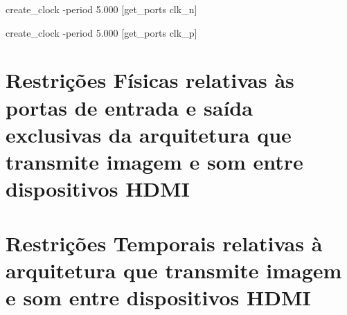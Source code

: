 \small{
	
	create\_clock -period 5.000 [get\_ports clk\_n]
	
	create\_clock -period 5.000 [get\_ports clk\_p]}

\section{Restrições Físicas relativas às portas de entrada e saída exclusivas da arquitetura que transmite imagem e som entre dispositivos HDMI}\label{ap:fisicas_planC_especificas}

\section{Restrições Temporais relativas à arquitetura que transmite imagem e som entre dispositivos HDMI} \label{ap:temporais_planC}
	





